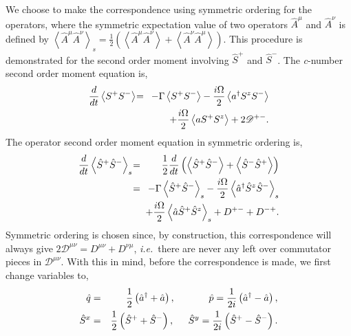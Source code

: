 \documentclass[aps,
twocolumn,
superscriptaddress,groupedaddress]{revtex4}
\begin{document}
We choose to make the correspondence using symmetric ordering for the operators, where the symmetric expectation value of two
operators $\hat{A}^{\mu}$ and $\hat{A}^{\nu}$ is defined by $\left< \hat{A}^{\mu} \hat{A}^{\nu}
\right>_s=\frac{1}{2} \left( \left< \hat{A}^{\mu} \hat{A}^{\nu} \right> + \left<
\hat{A}^{\nu} \hat{A}^{\mu} \right> \right)$. This procedure is demonstrated for the second order moment involving $\hat{S}^{+}$ and $\hat{S}^{-}$. The {\it c}-number second order moment equation is,
\begin{eqnarray}
\frac{d}{dt} \left<S^{+}S^{-} \right>  \hspace{-0.03in} &=&
\hspace{-0.03in}  - \Gamma  \left< S^{+} S^{-} \right>
-\frac{i \Omega}{2} \left< a^{\dagger} S^{z} S^{-} \right>
\nonumber
\\
 && +\frac{i \Omega}{2} \left< a S^{+} S^{z} \right> + 2 \mathscr{D}^{+-}.
 \label{c2om1}
\end{eqnarray}
The operator second order moment equation in symmetric ordering is, 
\begin{eqnarray}
\frac{d}{dt} \left<\hat{S}^{+}\hat{S}^{-} \right>_s  \hspace{-0.03in} &=&
\frac{1}{2} \frac{d}{dt} \left( \left<\hat{S}^{+}\hat{S}^{-} \right> + \left<\hat{S}^{-}\hat{S}^{+} \right> \right)
\nonumber
\\
&=&
\hspace{-0.03in}  - \Gamma  \left< \hat{S}^{+} \hat{S}^{-} \right>_s
-\frac{i \Omega}{2} \left< \hat{a}^{\dagger} \hat{S}^{z} \hat{S}^{-} \right> _s
\nonumber
\\
 && \hspace{-0.07in} +\frac{i \Omega}{2}  \left< \hat{a} \hat{S}^{+} \hat{S}^{z} \right>_s +
 D^{+-} +D^{-+}.
\end{eqnarray}
Symmetric ordering is chosen since, by construction, this correspondence will always give
$2\mathscr{D}^{\mu \nu}=D^{\mu \nu}+D^{\nu \mu}$, {\em i.e.}\ there are never
any left over commutator pieces in $\mathscr{D}^{\mu \nu}$. With this in mind, before the correspondence is made, we first change variables to,
\begin{eqnarray}
\hspace{-0.5in} \hat{q} &=&
\frac{1}{2} \left( \hat{a}^{\dagger} + \hat{a} \right),
\hspace{0.48in} \hat{p} =
\frac{1}{2i} \left( \hat{a}^{\dagger} - \hat{a} \right),
\\
\hat{S}^x &=&
\frac{1}{2} \left( \hat{S}^{+} + \hat{S}^{-} \right),
\hspace{0.2in} \hat{S}^y =
\frac{1}{2i} \left( \hat{S}^{+} - \hat{S}^{-} \right).
\end{eqnarray}
\end{document}
